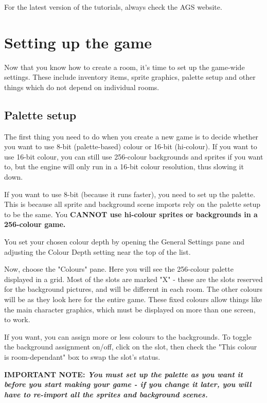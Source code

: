 For the latest version of the tutorials, always check the AGS website.


\section{Setting up the game}\label{Settingupthegame}%

Now that you know how to create a room, it's time to set up the game-wide
settings. These include inventory items, sprite graphics, palette setup
and other things which do not depend on individual rooms.

\subsection{Palette setup}\label{PalSetup}%

The first thing you need to do when you create a new game is to decide whether
you want to use 8-bit (palette-based) colour or 16-bit (hi-colour).
If you want to use 16-bit colour, you can still use 256-colour backgrounds and
sprites if you want to, but the engine will only run in a 16-bit colour
resolution, thus slowing it down.

If you want to use 8-bit (because it runs faster), you need to set up the
palette. This is because all sprite and background scene imports rely on the
palette setup to be the same. You \bf{CANNOT} use hi-colour sprites or backgrounds
in a 256-colour game.

You set your chosen colour depth by opening the General Settings pane and
adjusting the Colour Depth setting near the top of the list.

Now, choose the "Colours" pane. Here you will see the 256-colour
palette displayed in a grid. Most of the slots are marked "X" - these are the
slots reserved for the background pictures, and will be different in each
room. The other colours will be as they look here for the entire game. These
fixed colours allow things like the main character graphics, which must be
displayed on more than one screen, to work.

If you want, you can assign more or less colours to the backgrounds. To toggle
the background assignment on/off, click on the slot, then check the
"This colour is room-dependant" box to swap the slot's status.

\bf{IMPORTANT NOTE:} \it{You must set up the palette as you want it before you start
making your game - if you change it later, you will have to re-import all the
sprites and background scenes.}

